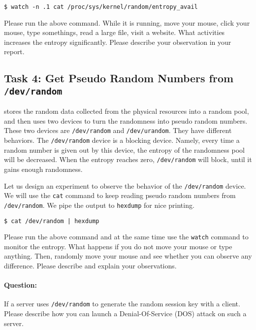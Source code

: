 \begin{lstlisting}
$ watch -n .1 cat /proc/sys/kernel/random/entropy_avail
\end{lstlisting}
 
Please run the above command. While it is running, move your mouse,
click your mouse, type somethings, read a large file, visit a website. 
What activities increases the entropy significantly. 
Please describe your observation 
in your report.




\subsection{Task 4: Get Pseudo Random Numbers from \texttt{/dev/random}}


\linux stores the random data collected from the physical resources into 
a random pool, and then uses two devices to turn the randomness 
into pseudo random numbers. These two devices are \texttt{/dev/random} and 
\texttt{/dev/urandom}. They have different behaviors. The \texttt{/dev/random}
device is a blocking device. Namely, every time a random number is given out by 
this device, the entropy of the randomness pool will be 
decreased. When the entropy reaches zero, \texttt{/dev/random} will block,
until it gains enough randomness.


Let us design an experiment to observe the behavior of the \texttt{/dev/random} device.
We will use the \texttt{cat} command to keep reading pseudo random numbers from 
\texttt{/dev/random}. We pipe the output to \texttt{hexdump} for nice printing.


\begin{lstlisting}
$ cat /dev/random | hexdump
\end{lstlisting}


Please run the above command and at the same time use the \texttt{watch}
command to monitor the entropy. What happens if you do not move your mouse or type anything. 
Then, randomly move your mouse and see whether you can observe any difference. 
Please describe and explain your observations. 



\paragraph{Question:} If a server uses 
\texttt{/dev/random} to generate the random session key
with a client. Please describe how you can launch a 
Denial-Of-Service (DOS) attack on such a server. 



